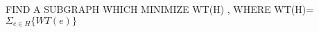 \documentclass[preview]{standalone}
\begin{document}
\begin{center}
FIND   A   SUBGRAPH   WHICH   MINIMIZE WT(H) ,  WHERE   WT(H)= $\Sigma_{e \in H} \{ WT(e) \}$
\end{center}
\end{document}
